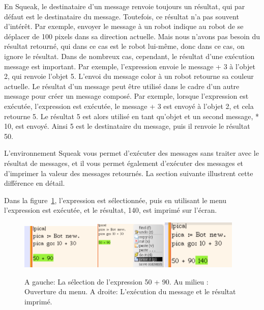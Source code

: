 \documentclass[a4paper,10pt,twoside]{book}
\begin{document}
En Squeak, le destinataire d'un message renvoie toujours un r\'esultat, qui par d\'efaut est le destinataire du message. Toutefois, ce r\'esultat n'a pas souvent d'int\'er\^et. Par exemple, envoyer le message  \`a un robot indique au robot de se d\'eplacer de 100 pixels dans sa direction actuelle. Mais nous n'avons pas besoin du r\'esultat retourn\'e, qui dans ce cas est le robot lui-m\^eme, donc dans ce cas, on ignore le r\'esultat. Dans de nombreux cas, cependant, le r\'esultat d'une ex\'ecution message est important. Par exemple, l'expression  envoie le message + 3 \`a l'objet 2, qui renvoie l'objet 5. L'envoi du message color \`a un robot retourne sa couleur actuelle. Le r\'esultat d'un message peut \^etre utilis\'e dans le cadre d'un autre message pour cr\'eer un message compos\'e. Par exemple, lorsque l'expression  est ex\'ecut\'ee, l'expression  est ex\'ecut\'ee, le message + 3 est envoy\'e \`a l'objet 2, et cela retourne 5. Le r\'esultat 5 est alors utilis\'e en tant qu'objet et un second message, * 10, est envoy\'e. Ainsi 5 est le destinataire du message, puis il renvoie le r\'esultat 50. 

L'environnement Squeak vous permet d'ex\'ecuter des messages sans traiter avec le r\'esultat de messages, et il vous permet \'egalement d'ex\'ecuter des messages et d'imprimer la valeur des messages retourn\'es. La section suivante illustrent cette diff\'erence en d\'etail. 

 

Dans la figure~\ref{fig:printitMenu}, l'expression  est s\'electionn\'ee, puis en utilisant le menu l'expression est ex\'ecut\'ee, et le r\'esultat, 140, est imprim\'e sur l'\'ecran. 

\begin{figure}[h]
\includegraphics[width=3.8cm]{selectingExp}\hfill \includegraphics[width=3.5cm]{selectMenu}\hfill\includegraphics[width=3.5cm]{resultExpression}
\caption{A gauche: La s\'election de l'expression 50 + 90. Au milieu : Ouverture du menu. A droite: L'ex\'ecution du message et le r\'esultat imprim\'e. \label{fig:printitMenu}}
\end{figure}
\end{document}
